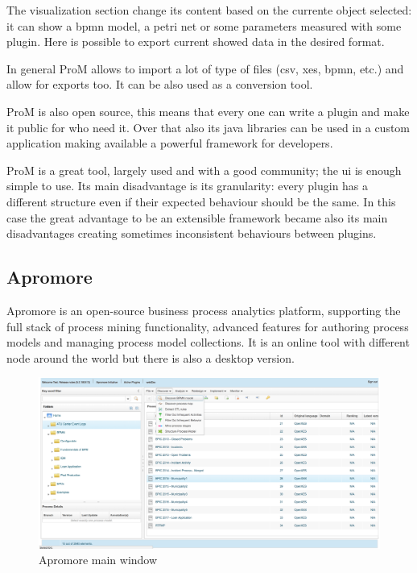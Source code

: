 The visualization section change its content based on the currente object selected: it can show a bpmn model, a petri net or 
some parameters measured with some plugin. Here is possible to export current showed data in the desired format.

In general ProM allows to import a lot of type of files (csv, xes, bpmn, etc.) and allow for exports too. It can be also 
used as a conversion tool.

ProM is also open source, this means that every one can write a plugin and make it public for who need it. Over that also its 
java libraries can be used in a custom application making available a powerful framework for developers.

ProM is a great tool, largely used and with a good community; the ui is enough simple to use. Its main disadvantage is its 
granularity: every plugin has a different structure even if their expected behaviour should be the same. In this case the 
great advantage to be an extensible framework became also its main disadvantages creating sometimes inconsistent behaviours 
between plugins.


\subsection{Apromore}
Apromore is an open-source business process analytics platform, supporting the full stack of process mining functionality, 
advanced features for authoring process models and managing process model collections. It is an online tool with different 
node around the world but there is also a desktop version. 

\begin{figure}[!ht]
    \centering
\includegraphics[width=\textwidth]{images/apromore_screen.png}
    \caption{Apromore main window}
    \label{images:apromore_screen}
\end{figure}

